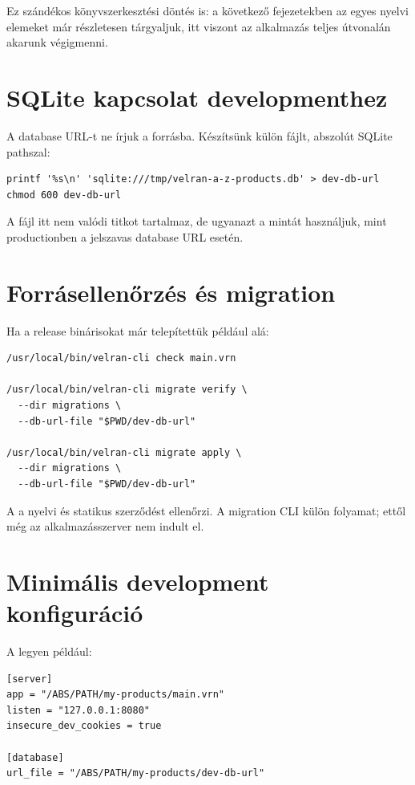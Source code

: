 Ez szándékos könyvszerkesztési döntés is: a következő fejezetekben az egyes nyelvi elemeket már részletesen tárgyaljuk, itt viszont az alkalmazás teljes útvonalán akarunk végigmenni.

\section{SQLite kapcsolat developmenthez}

A database URL-t ne írjuk a forrásba. Készítsünk külön fájlt, abszolút SQLite pathszal:

\begin{lstlisting}
printf '%s\n' 'sqlite:///tmp/velran-a-z-products.db' > dev-db-url
chmod 600 dev-db-url
\end{lstlisting}

A fájl itt nem valódi titkot tartalmaz, de ugyanazt a  mintát használjuk, mint productionben a jelszavas database URL esetén.

\section{Forrásellenőrzés és migration}

Ha a release binárisokat már telepítettük például  alá:

\begin{lstlisting}
/usr/local/bin/velran-cli check main.vrn

/usr/local/bin/velran-cli migrate verify \
  --dir migrations \
  --db-url-file "$PWD/dev-db-url"

/usr/local/bin/velran-cli migrate apply \
  --dir migrations \
  --db-url-file "$PWD/dev-db-url"
\end{lstlisting}

A \code{check} a nyelvi és statikus szerződést ellenőrzi. A migration CLI külön folyamat; ettől még az alkalmazásszerver nem indult el.

\section{Minimális development konfiguráció}

A \code{server.toml} legyen például:

\begin{lstlisting}
[server]
app = "/ABS/PATH/my-products/main.vrn"
listen = "127.0.0.1:8080"
insecure_dev_cookies = true

[database]
url_file = "/ABS/PATH/my-products/dev-db-url"
\end{lstlisting}

